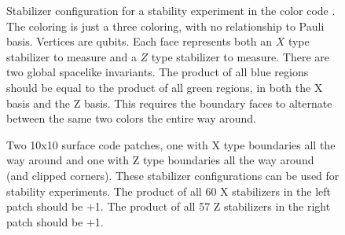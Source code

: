 \documentclass[onecolumn,unpublished,a4paper]{quantumarticle}
\theoremstyle{definition}
\theoremstyle{definition}
\theoremstyle{definition}
\begin{document}
\begin{figure}
    \centering
    \caption{
        Stabilizer configuration for a stability experiment in the color code \cite{bombin2006topological}.
        The coloring is just a three coloring, with no relationship to Pauli basis.
        Vertices are qubits.
        Each face represents both an $X$ type stabilizer to measure and a $Z$ type stabilizer to measure.
        There are two global spacelike invariants.
        The product of all blue regions should be equal to the product of all green regions, in both the X basis and the Z basis.
        This requires the boundary faces to alternate between the same two colors the entire way around.
    }
    \label{fig:color_code_stability}
\end{figure}

\begin{figure}
    \centering
    \caption{
        Two 10x10 surface code patches, one with X type boundaries all the way around and one with Z type boundaries all the way around (and clipped corners).
        These stabilizer configurations can be used for stability experiments.
        The product of all 60 X stabilizers in the left patch should be +1.
        The product of all 57 Z stabilizers in the right patch should be +1.
    }
    \label{fig:10x10_XZ}
\end{figure}
\end{document}
